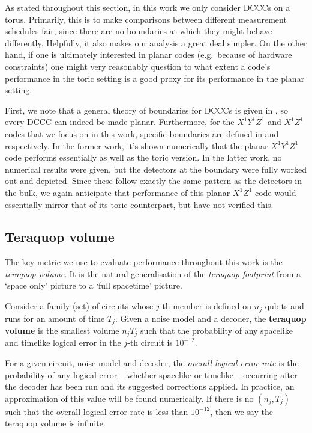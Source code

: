 As stated throughout this section, in this work we only consider DCCCs on a torus. Primarily, this is to make comparisons between different measurement schedules fair, since there are no boundaries at which they might behave differently. Helpfully, it also makes our analysis a great deal simpler. On the other hand, if one is ultimately interested in planar codes (e.g.\ because of hardware constraints) one might very reasonably question to what extent a code's performance in the toric setting is a good proxy for its performance in the planar setting.

First, we note that a general theory of boundaries for DCCCs is given in , so every DCCC can indeed be made planar. Furthermore, for the $X^1 Y^1 Z^1$ and $X^1 Z^1$ codes that we focus on in this work, specific boundaries are defined in  and  respectively. In the former work, it's shown numerically that the planar $X^1 Y^1 Z^1$ code performs essentially as well as the toric version. In the latter work, no numerical results were given, but the detectors at the boundary were fully worked out and depicted. Since these follow exactly the same pattern as the detectors in the bulk, we again anticipate that performance of this planar $X^1 Z^1$ code would essentially mirror that of its toric counterpart, but have not verified this.

\subsection{Teraquop volume}

The key metric we use to evaluate performance throughout this work is the \textit{teraquop volume}.
It is the natural generalisation of the \emph{teraquop footprint} \cite{gidney2021fault} from a `space only' picture to a `full spacetime' picture.

\begin{definition}
    Consider a family (set) of circuits whose $j$-th member is defined on $n_j$ qubits and runs for an amount of time $T_j$.
    Given a noise model and a decoder,
    the \textbf{teraquop volume} is the smallest volume $n_j T_j$ such that the probability of any spacelike and timelike logical error in the $j$-th circuit is $10^{-12}$.
\end{definition}

For a given circuit, noise model and decoder, the \emph{overall logical error rate} is the probability of any logical error -- whether spacelike or timelike -- occurring after the decoder has been run and its suggested corrections applied.
In practice, an approximation of this value will be found numerically.
If there is no $(n_j, T_j)$ such that the overall logical error rate is less than $10^{-12}$,
then we say the teraquop volume is infinite.

